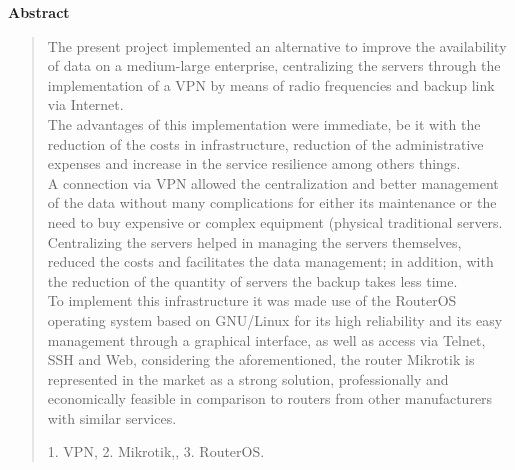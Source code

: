 \thispagestyle{empty}
\begin{center}
\begin{LARGE}
\textbf{Abstract}
\end{LARGE}
\end{center}

\begin{quotation}
The present project implemented an alternative to improve the availability of data on a medium-large enterprise, centralizing the servers through the implementation of a VPN by means of radio frequencies and backup link via Internet.\\
The advantages of this implementation were immediate, be it with the reduction of the costs in infrastructure, reduction of the administrative expenses and increase in the service resilience among others things.\\
A connection via VPN allowed the centralization and better management of the data without many complications for either its maintenance or the need to buy expensive or complex equipment (physical traditional servers.\\
Centralizing the servers helped in managing the servers themselves, reduced the costs and facilitates the data management; in addition, with the reduction of the quantity of servers the backup takes less time.\\
To implement this infrastructure it was made use of the RouterOS operating system based on GNU/Linux for its high reliability and its easy management through a graphical interface, as well as access via Telnet, SSH and Web, considering the aforementioned, the router Mikrotik is represented in the market as a strong solution, professionally and economically feasible in comparison to routers from other manufacturers with similar services.
\vspace*{0.5cm}

 1. VPN, 2. Mikrotik,, 3. RouterOS. 

\end{quotation}

